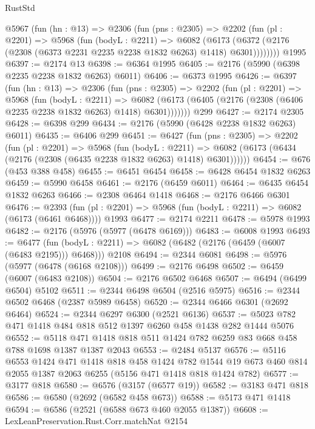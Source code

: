 \begin{lexlean}{RustStd}
\begin{coremodule}
{\begin{coremodule}
{{{{{{{{{{    @5967
      (fun (hn : @13) =>
      @2306
        (fun (pns : @2305) =>
        @2202
          (fun (pl : @2201) =>
          @5968
            (fun (bodyL : @2211) =>
            @6082
              (@6173 (@6372 (@2176 (@2308 (@6373 @2231 @2235 @2238 @1832 @6263) @1418) @6301))))))))
    @1995
@6397 := @2174 @13
@6398 := @6364 @1995
@6405 := @2176 (@5990 (@6398 @2235 @2238 @1832 @6263) @6011)
@6406 := @6373 @1995
@6426 := @6397
    (fun (hn : @13) =>
    @2306
      (fun (pns : @2305) =>
      @2202
        (fun (pl : @2201) =>
        @5968
          (fun (bodyL : @2211) =>
          @6082 (@6173 (@6405 (@2176 (@2308 (@6406 @2235 @2238 @1832 @6263) @1418) @6301)))))))
    @299
@6427 := @2174 @2305
@6428 := @6398 @299
@6434 := @2176 (@5990 (@6428 @2238 @1832 @6263) @6011)
@6435 := @6406 @299
@6451 := @6427
    (fun (pns : @2305) =>
    @2202
      (fun (pl : @2201) =>
      @5968
        (fun (bodyL : @2211) =>
        @6082 (@6173 (@6434 (@2176 (@2308 (@6435 @2238 @1832 @6263) @1418) @6301))))))
@6454 := @676 (@453 @388 @458)
@6455 := @6451 @6454
@6458 := @6428 @6454 @1832 @6263
@6459 := @5990 @6458
@6461 := @2176 (@6459 @6011)
@6464 := @6435 @6454 @1832 @6263
@6466 := @2308 @6464 @1418
@6468 := @2176 @6466 @6301
@6476 := @2393
    (fun (pl : @2201) => @5968 (fun (bodyL : @2211) => @6082 (@6173 (@6461 @6468))))
    @1993
@6477 := @2174 @2211
@6478 := @5978 @1993
@6482 := @2176 (@5976 (@5977 (@6478 @6169)))
@6483 := @6008 @1993
@6493 := @6477
    (fun (bodyL : @2211) => @6082 (@6482 (@2176 (@6459 (@6007 (@6483 @2195))) @6468)))
    @2108
@6494 := @2344 @6081
@6498 := @5976 (@5977 (@6478 (@6168 @2108)))
@6499 := @2176 @6498
@6502 := @6459 (@6007 (@6483 @2108))
@6504 := @2176 @6502 @6468
@6507 := @6494 (@6499 @6504) @5102
@6511 := @2344 @6498 @6504 (@2516 @5975)
@6516 := @2344 @6502 @6468 (@2387 @5989 @6458)
@6520 := @2344 @6466 @6301 (@2692 @6464)
@6524 := @2344 @6297 @6300 (@2521 @6136)
@6537 := @5023 @782 @471 @1418 @484 @818 @512 @1397 @6260 @458 @1438 @282 @1444 @5076
@6552 := @5118 @471 @1418 @818 @511 @1424 @782 @6259 @83 @668 @458 @788 @1698 @1387 @1387 @2043
@6553 := @2484 @5137
@6576 := @5116
    @6553
    @1424
    @471
    @1418
    @818
    @458
    @1424
    @782
    @1544
    @19
    @673
    @460
    @814
    @2055
    @1387
    @2063
    @6255
    (@5156 @471 @1418 @818 @1424 @782)
@6577 := @3177 @818
@6580 := @6576 (@3157 (@6577 @19))
@6582 := @3183 @471 @818
@6586 := @6580 (@2692 (@6582 @458 @673))
@6588 := @5173 @471 @1418
@6594 := @6586 (@2521 (@6588 @673 @460 @2055 @1387))
@6608 := LexLeanPreservation.Rust.Corr.matchNat
    @2154
}}}}}}}}}}
\end{coremodule}}
\end{coremodule}
\end{lexlean}
